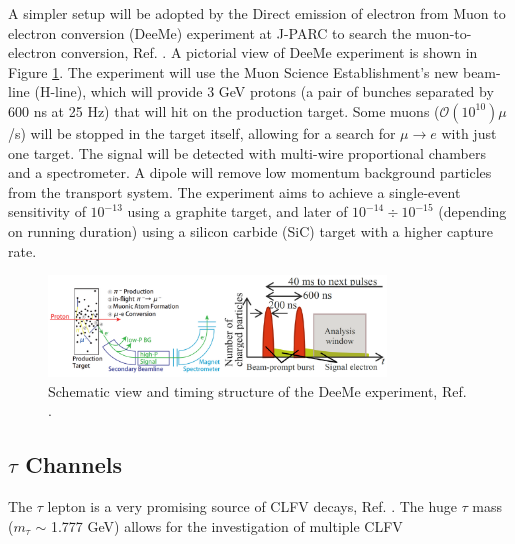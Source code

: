 A simpler setup will be adopted by the Direct emission of electron from Muon to electron conversion (DeeMe) 
experiment at J-PARC to search the muon-to-electron conversion, Ref. \cite{deeme}.
A pictorial view of DeeMe experiment is shown in Figure 
\ref{fig:deeme}.
The experiment will use the Muon Science Establishment's new beam-line (H-line), 
which will provide 3 GeV protons (a pair of bunches separated by 600 ns at 25 Hz) 
that will hit on the production target. Some muons ($\mathcal{O}(10^{10})\mu$/s) will be stopped in the target itself, 
allowing for a search for $\mu \rightarrow e$ with just one target. The signal will be detected 
with multi-wire proportional chambers and a spectrometer. 
A dipole will remove low momentum background particles from the transport system. 
The experiment aims to achieve a single-event 
sensitivity of $10^{-13}$ using a graphite target, 
and later of $10^{-14} \div 10^{-15}$ (depending on running duration) using a silicon carbide (SiC) target with a higher capture rate. 
\begin{figure}[!h]
    \centering
    \includegraphics[width =0.8\textwidth]{figures/png/Screenshot_20240322_101840.png}
    \caption[DeeMe experiment.]{Schematic view and timing structure of the DeeMe experiment, Ref. \cite{deeme}.}
    \label{fig:deeme}
    \end{figure}
\subsection{$\tau$ Channels}
The $\tau$ lepton is a very promising source of CLFV decays, Ref. \cite{universe8060299}. 
{\red The huge $\tau$ mass ($m_\tau$ $\sim$ 1.777 GeV)} allows for the investigation of multiple CLFV

